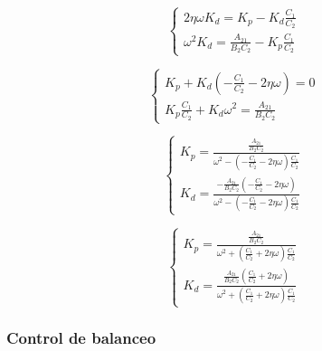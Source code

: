 \documentclass{article}
\begin{document}
                \begin{equation}
                    \begin{cases}
                        2 \eta \omega K_d=  K_p - K_d \frac{C_1 }{C_2} \\
                        \omega^2 K_d = \frac{A_{21}}{B_{2} C_2} - K_p \frac{C_1}{C_2}
                    \end{cases}
                \end{equation}

                \begin{equation}
                    \begin{cases}
                        K_p + K_d (-\frac{C_1}{C_2} - 2 \eta \omega) = 0 \\
                        K_p \frac{C_1}{C_2} + K_d \omega^2 = \frac{A_{21}}{B_{2} C_2} 
                    \end{cases}
                \end{equation}

                \begin{equation}
                    \begin{cases}
                        K_p = \frac{\frac{A_{21}}{B_{2} C_2}}{\omega^2-(-\frac{C_1}{C_2} - 2 \eta \omega)\frac{C_1}{C_2}} \\
                        K_d = \frac{-\frac{A_{21}}{B_{2} C_2} (-\frac{C_1}{C_2} - 2 \eta \omega)}{\omega^2-(-\frac{C_1}{C_2} - 2 \eta \omega)\frac{C_1}{C_2}}
                    \end{cases}
                \end{equation}

                \begin{equation}
                    \begin{cases}
                        K_p = \frac{\frac{A_{21}}{B_{2} C_2}}{\omega^2+(\frac{C_1}{C_2} + 2 \eta \omega)\frac{C_1}{C_2}} \\
                        K_d = \frac{\frac{A_{21}}{B_{2} C_2} (\frac{C_1}{C_2} + 2 \eta \omega)}{\omega^2+(\frac{C_1}{C_2} + 2 \eta \omega)\frac{C_1}{C_2}}
                    \end{cases}
                \end{equation}





\subsubsection{Control de balanceo}
\end{document}
